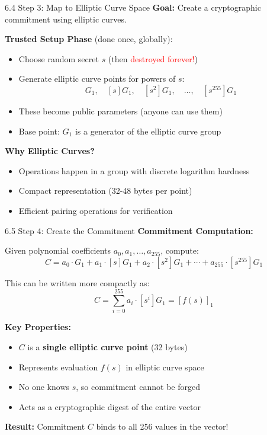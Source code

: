 \documentclass{beamer}
\begin{document}
\begin{frame}{6.4 Step 3: Map to Elliptic Curve Space}
    \textbf{Goal:} Create a cryptographic commitment using elliptic curves.
    
    \vspace{0.3cm}
    \textbf{Trusted Setup Phase} (done once, globally):
    \begin{itemize}
        \item Choose random secret $s$ (then \textcolor{red}{destroyed forever!})
        \item Generate elliptic curve points for powers of $s$:
        \[
        G_1, \quad [s]G_1, \quad [s^2]G_1, \quad \dots, \quad [s^{255}]G_1
        \]
        \item These become public parameters (anyone can use them)
        \item Base point: $G_1$ is a generator of the elliptic curve group
    \end{itemize}
    
    \pause
    \vspace{0.3cm}
    \textbf{Why Elliptic Curves?}
    \begin{itemize}
        \item Operations happen in a group with discrete logarithm hardness
        \item Compact representation (32-48 bytes per point)
        \item Efficient pairing operations for verification
    \end{itemize}
\end{frame}

\begin{frame}{6.5 Step 4: Create the Commitment}
    \textbf{Commitment Computation:}
    
    Given polynomial coefficients $a_0, a_1, \dots, a_{255}$, compute:
    \[
    C = a_0 \cdot G_1 + a_1 \cdot [s]G_1 + a_2 \cdot [s^2]G_1 + \cdots + a_{255} \cdot [s^{255}]G_1
    \]
    
    \pause
    This can be written more compactly as:
    \[
    C = \sum_{i=0}^{255} a_i \cdot [s^i]G_1 = [f(s)]_1
    \]
    
    \pause
    \vspace{0.3cm}
    \textbf{Key Properties:}
    \begin{itemize}
        \item $C$ is a \textbf{single elliptic curve point} (32 bytes)
        \item Represents evaluation $f(s)$ in elliptic curve space
        \item No one knows $s$, so commitment cannot be forged
        \item Acts as a cryptographic digest of the entire vector
    \end{itemize}
    
    \pause
    \vspace{0.2cm}
    \textbf{Result:} Commitment $C$ binds to all 256 values in the vector!
\end{frame}
\end{document}
